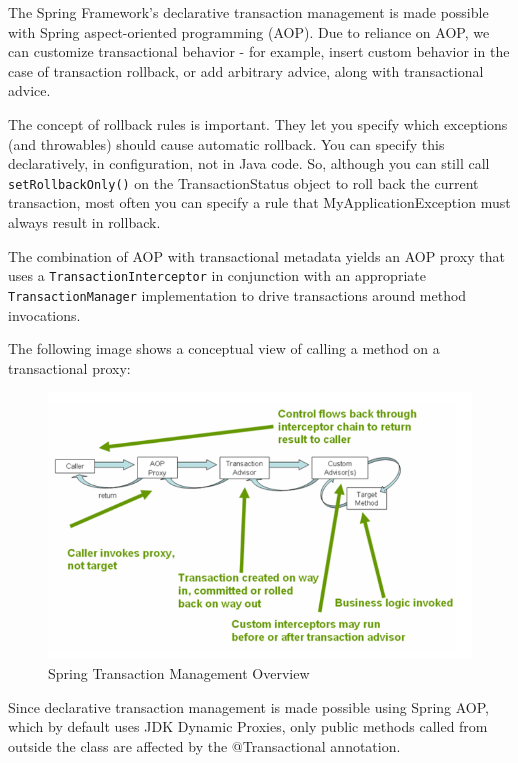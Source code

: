 \documentclass{scrartcl}
\begin{document}
The Spring Framework’s declarative transaction management is made possible with Spring aspect-oriented programming (AOP). Due to reliance on AOP, we can customize transactional behavior - for example, insert custom behavior in the case of transaction rollback, or add arbitrary advice, along with transactional advice.

The concept of rollback rules is important. They let you specify which exceptions (and throwables) should cause automatic rollback. You can specify this declaratively, in configuration, not in Java code. So, although you can still call \lstinline|setRollbackOnly()| on the TransactionStatus object to roll back the current transaction, most often you can specify a rule that MyApplicationException must always result in rollback.

The combination of AOP with transactional metadata yields an AOP proxy that uses a \lstinline|TransactionInterceptor| in conjunction with an appropriate \lstinline|TransactionManager| implementation to drive transactions around method invocations.

The following image shows a conceptual view of calling a method on a transactional proxy:

\begin{figure}[h]
    \centering
    \includegraphics[width=1\linewidth]{transactions-aop}
    \caption{Spring Transaction Management Overview}
    \label{fig:transactions-aop}
\end{figure}

Since declarative transaction management is made possible using Spring AOP, which by default uses JDK Dynamic Proxies, only public methods called from outside the class are affected by the @Transactional annotation.
\end{document}
